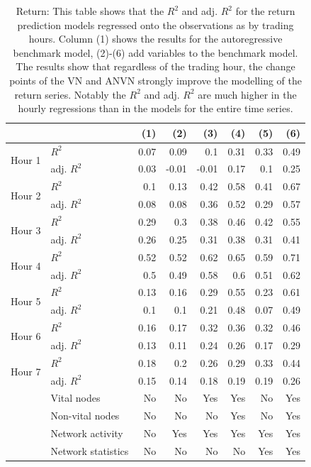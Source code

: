 \begin{table}[ht]
\centering
\caption{Return: This table shows that the $R^2$ and adj. $R^2$ for the return prediction models regressed onto the observations 
                     as by trading hours. Column (1) shows the results for the autoregressive benchmark model, (2)-(6) add variables to the benchmark model.  The results show that regardless of the trading hour, the change points of the VN and ANVN strongly 
                     improve the modelling of the return series. Notably the $R^2$ and adj. $R^2$ are much higher in the hourly regressions than 
                     in the models for the entire time series.} 
\label{table_hourly_RET}
\begingroup\scriptsize
\begin{tabular}{ll|rrrrrr}
   &   & (1) & (2) & (3) & (4) & (5) & (6) \\ 
  \hline
\multirow{2}{*}{Hour 1} & $R^2$ & 0.07 & 0.09 & 0.1 & 0.31 & 0.33 & 0.49 \\ 
    & adj. $R^2$ & 0.03 & -0.01 & -0.01 & 0.17 & 0.1 & 0.25 \\ 
   \hline
\multirow{2}{*}{Hour 2} & $R^2$ & 0.1 & 0.13 & 0.42 & 0.58 & 0.41 & 0.67 \\ 
    & adj. $R^2$ & 0.08 & 0.08 & 0.36 & 0.52 & 0.29 & 0.57 \\ 
   \hline
\multirow{2}{*}{Hour 3} & $R^2$ & 0.29 & 0.3 & 0.38 & 0.46 & 0.42 & 0.55 \\ 
    & adj. $R^2$ & 0.26 & 0.25 & 0.31 & 0.38 & 0.31 & 0.41 \\ 
   \hline
\multirow{2}{*}{Hour 4} & $R^2$ & 0.52 & 0.52 & 0.62 & 0.65 & 0.59 & 0.71 \\ 
    & adj. $R^2$ & 0.5 & 0.49 & 0.58 & 0.6 & 0.51 & 0.62 \\ 
   \hline
\multirow{2}{*}{Hour 5} & $R^2$ & 0.13 & 0.16 & 0.29 & 0.55 & 0.23 & 0.61 \\ 
    & adj. $R^2$ & 0.1 & 0.1 & 0.21 & 0.48 & 0.07 & 0.49 \\ 
   \hline
\multirow{2}{*}{Hour 6} & $R^2$ & 0.16 & 0.17 & 0.32 & 0.36 & 0.32 & 0.46 \\ 
    & adj. $R^2$ & 0.13 & 0.11 & 0.24 & 0.26 & 0.17 & 0.29 \\ 
   \hline
\multirow{2}{*}{Hour 7} & $R^2$ & 0.18 & 0.2 & 0.26 & 0.29 & 0.33 & 0.44 \\ 
    & adj. $R^2$ & 0.15 & 0.14 & 0.18 & 0.19 & 0.19 & 0.26 \\ 
   \hline & Vital nodes & No & No & Yes & Yes & No & Yes \\ & Non-vital nodes & No & No & No & Yes & No & Yes \\ & Network activity & No & Yes & Yes & Yes & Yes & Yes \\ & Network statistics & No & No & No & No & Yes & Yes \\ \hline
\hline
\end{tabular}
\endgroup
\end{table}

